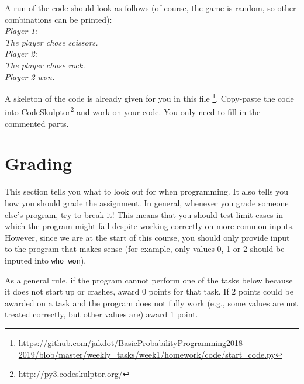 \documentclass[11pt, a4paper]{article}
\newcommand{\link}[1]{\footnote{\color{blue}\href{#1}{#1}}}
\begin{document}
A run of the code should look as follows (of course, the game is random, so other combinations can be printed):\\
\noindent \textit{
Player 1:\\
The player chose scissors.\\
Player 2:\\
The player chose rock.\\
Player 2 won.}

A skeleton of the code is already given for you in this file \footnote{\href{https://github.com/jakdot/BasicProbabilityProgramming2018-2019/blob/master/weekly_tasks/week1/homework/code/start_code.py}{https://github.com/jakdot/BasicProbabilityProgramming2018-2019/blob/master/weekly\_tasks/week1/homework/code/start\_code.py}}. Copy-paste the code into  CodeSkulptor\link{http://py3.codeskulptor.org/} and work on your code. You only need to fill in the commented parts.

\section{Grading}
This section tells you what to look out for when programming. It also tells you how you should grade the assignment. In general, whenever you grade 
someone else's program, try to break it! This means that you should test limit cases in which the program might fail despite working correctly
on more common inputs. However, since we are at the start of this course, you should only provide input
to the program that makes sense (for example, only values 0, 1 or 2 should be inputed into \texttt{who\_won}).

As a general rule, if the program cannot perform one of the tasks below because it does not start up or crashes, award 0 points for that task. If 2 points could be awarded on a task and the program does not fully work (e.g., some values are not treated correctly, but other values are) award 1 point.

\enlargethispage{1cm}
\end{document}
